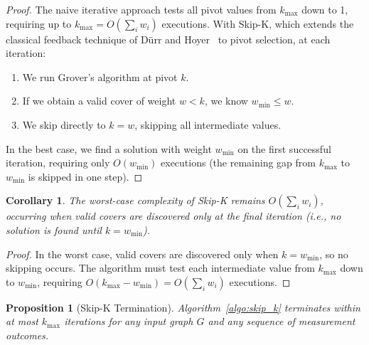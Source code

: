 \documentclass{ieeeaccess}
\newtheorem{prop}{Proposition}
\newtheorem{cor}{Corollary}
\newenvironment{prf}{\begin{proof}}{\end{proof}}
\begin{document}
\begin{prf}
The naive iterative approach tests all pivot values from
$k_{\max}$ down to 1, requiring up to
$k_{\max} = O(\sum_i w_i)$ executions. With Skip-K, which
extends the classical feedback technique of D\"{u}rr and
Hoyer~\cite{durr_quantum_1999} to pivot selection, at each
iteration:
\begin{enumerate}
    \item We run Grover's algorithm at pivot $k$.
    \item If we obtain a valid cover of weight $w < k$,
          we know $w_{\min} \leq w$.
    \item We skip directly to $k = w$, skipping all
          intermediate values.
\end{enumerate}
In the best case, we find a solution with weight $w_{\min}$
on the first successful iteration, requiring only
$O(w_{\min})$ executions (the remaining gap from $k_{\max}$
to $w_{\min}$ is skipped in one step).
\end{prf}

\begin{cor}
\label{cor:skipk-worst}
The worst-case complexity of Skip-K remains
$O(\sum_i w_i)$, occurring when valid covers are discovered
only at the final iteration (i.e., no solution is found
until $k = w_{\min}$).
\end{cor}

\begin{prf}
In the worst case, valid covers are discovered only when
$k = w_{\min}$, so no skipping occurs. The algorithm must
test each intermediate value from $k_{\max}$ down to
$w_{\min}$, requiring $O(k_{\max} - w_{\min}) =
O(\sum_i w_i)$ executions.
\end{prf}

\begin{prop}[Skip-K Termination]
\label{prop:skipk-termination}
Algorithm~\ref{algo:skip_k} terminates within at most
$k_{\max}$ iterations for any input graph $G$ and any
sequence of measurement outcomes.
\end{prop}
\end{document}

